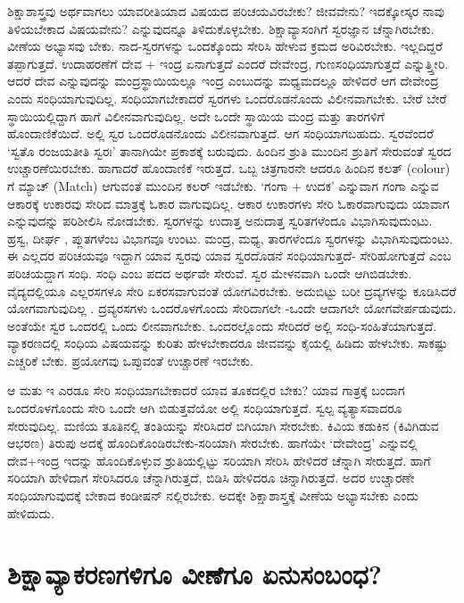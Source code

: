 ಶಿಕ್ಷಾಶಾಸ್ತ್ರವು ಅರ್ಥವಾಗಲು ಯಾವರೀತಿಯಾದ ವಿಷಯದ ಪರಿಚಯವಿರಬೇಕು? ಜೀವವೇನು? ಇದಕ್ಕೋಸ್ಕರ ನಾವು ತಿಳಿಯಬೇಕಾದ ವಿಷಯವೇನು? ಎನ್ನುವುದನ್ನೂ ತಿಳಿದುಕೊಳ್ಳಬೇಕು. ಶಿಕ್ಷಾವ್ಯಾಸಂಗಿಗೆ ಸ್ವರಜ್ಞಾನ ಚೆನ್ನಾಗಿರಬೇಕು. ವೀಣೆಯ ಅಭ್ಯಾಸವು ಬೇಕು. ನಾದ-ಸ್ವರಗಳನ್ನು ಒಂದಕ್ಕೊಂದು ಸೇರಿಸಿ ಹೇಳುವ ಕ್ರಮದ ಅರಿವಿರಬೇಕು. ಇಲ್ಲದಿದ್ದರೆ ತಪ್ಪಾಗುತ್ತದೆ. ಉದಾಹರಣೆಗೆ ದೇವ + ಇಂದ್ರ  ಏನಾಗುತ್ತದೆ ಎಂದರೆ ದೇವೇಂದ್ರ, ಗುಣಸಂಧಿಯಾಗುತ್ತದೆ ಎನ್ನುತ್ತ್ತೀರಿ. ಆದರೆ ದೇವ ಎನ್ನುವುದನ್ನು ಮಂದ್ರಸ್ಥಾಯಿಯಲ್ಲೂ ಇಂದ್ರ ಎಂಬುದನ್ನು ಮಧ್ಯಮದಲ್ಲೂ  ಹೇಳಿದರೆ ಆಗ ದೇವೇಂದ್ರ ಎಂದು ಸಂಧಿಯಾಗುವುದಿಲ್ಲ. ಸಂಧಿಯಾಗಬೇಕಾದರೆ ಸ್ವರಗಳು ಒಂದರೊಡನೊಂದು ವಿಲೀನವಾಗಬೇಕು. ಬೇರೆ ಬೇರೆ ಸ್ಥಾಯಿಯಲ್ಲಿದ್ದಾಗ ಹಾಗೆ ವಿಲೀನವಾಗುವುದಿಲ್ಲ. ಅದೇ ಒಂದೇ ಸ್ಥಾಯಿಯ ಮಂದ್ರ ಮತ್ತು ತಾರಗಳಿಗೆ ಹೊಂದಾಣಿಕೆಯಿದೆ. ಅಲ್ಲಿ ಸ್ವರ ಒಂದರೊಡನೊಂದು ವಿಲೀನವಾಗುತ್ತದೆ. ಆಗ ಸಂಧಿಯಾಗಬಹುದು. ಸ್ವರವೆಂದರೆ `ಸ್ವತೊ ರಂಜಯತೀತಿ ಸ್ವರಃ'\label{11} ತಾನಾಗಿಯೇ ಪ್ರಕಾಶಕ್ಕೆ ಬರುವುದು. ಹಿಂದಿನ ಶ್ರುತಿ ಮುಂದಿನ ಶ್ರುತಿಗೆ ಸೇರುವಂತೆ ಸ್ವರದ ಉಚ್ಚಾರಣೆಯಿರಬೇಕು. ಹಾಗಾದರೆ ಹೊಂದಾಣಿಕೆ ಇರುತ್ತದೆ. ಒಬ್ಬ ಚಿತ್ರಗಾರನೇ ಆದರೂ ಹಿಂದಿನ ಕಲತ್ {(\eng colour)} ಗೆ ಮ್ಯಾಚ್ {(\eng Match)} ಆಗುವಂತೆ ಮುಂದಿನ ಕಲರ್ ಇಡಬೇಕು. `ಗಂಗಾ + ಉದಕ' ಎನ್ನುವಾಗ ಗಂಗಾ ಎನ್ನುವ ಆಕಾರಕ್ಕೆ  ಉಕಾರವು ಸೇರಿದ ಮಾತ್ರಕ್ಕೆ  ಓಕಾರ ವಾಗುವುದಿಲ್ಲ. ಆಕಾರ ಉಕಾರಗಳು ಸೇರಿ ಓಕಾರವಾಗುವುದು ಯಾವಾಗ ಎನ್ನುವುದನ್ನು ಪರಿಶೀಲಿಸಿ ನೋಡಬೇಕು. ಸ್ವರಗಳನ್ನು ಉದಾತ್ತ ಅನುದಾತ್ತ ಸ್ವರಿತಗಳೆಂದೂ ವಿಭಾಗಿಸುವುದುಂಟು. ಹ್ರಸ್ವ, ದೀರ್ಘ , ಪ್ಲುತಗಳೆಂಬ ವಿಭಾಗವೂ ಉಂಟು. ಮಂದ್ರ, ಮಧ್ಯ, ತಾರಗಳೆಂದೂ ಸ್ವರಗಳನ್ನು  ವಿಭಾಗಿಸುವುದುಂಟು. ಈ ಎಲ್ಲದರ ಪರಿಚಯವೂ ಇದ್ದಾಗ ಯಾವ ಸ್ವರವು ಯಾವ ಸ್ವರದೊಡನೆ ಸಂಧಿಯಾಗುತ್ತದೆ- ಸೇರಿಹೋಗುತ್ತದೆ ಎಂಬ ಪರಿಚಯದ್ದಾಗ ಸಂಧಿ. ಸಂಧಿ ಎಂಬ ಪದದ ಅರ್ಥವೇ ಸೇರುವೆ. ಸ್ವರ ಮೇಳನವಾಗಿ ಒಂದೇ ಆಗಿಬಿಡಬೇಕು. ವೈದ್ಯದಲ್ಲಿಯೂ ಎಲ್ಲರಸಗಳೂ ಸೇರಿ  ಏಕರಸವಾಗುವಂತೆ ಯೋಗವಿರಬೇಕು. ಅದುಬಿಟ್ಟು ಬರೀ ದ್ರವ್ಯಗಳನ್ನು ಕೂಡಿಸಿದರೆ ಯೋಗವಾಗುವುದಿಲ್ಲ .  ದ್ರವ್ಯರಸಗಳು ಒಂದರೊಳಗೊಂದು ಸೇರಿದಾಗಲೇ -ಒಂದೇ ಆದಾಗಲೇ ಯೋಗವೇರ್ಪಡುವುದು. ಅಂತೆಯೇ ಸ್ವರ ಒಂದರಲ್ಲಿ ಒಂದು ಲೀನವಾಗಬೇಕು. ಒಂದರಲ್ಲೊಂದು ಸೇರಿದರೆ ಅಲ್ಲಿ ಸಂಧಿ-ಸಂಹಿತೆಯಾಗುತ್ತದೆ. ವ್ಯಾಕರಣದಲ್ಲಿ ಸಂಧಿಯ ವಿಷಯವನ್ನು ಕುರಿತು ಹೇಳಬೇಕಾದರೂ ಜೀವವನ್ನು ಕೈಯಲ್ಲಿ ಹಿಡಿದು ಹೇಳಬೇಕು. ಸಾಕಷ್ಟು ಎಚ್ಚರಿಕೆ ಬೇಕು. ಪ್ರಯೋಗವು ಒಪ್ಪುವಂತೆ ಉಚ್ಚಾರಣೆ ಇರಬೇಕು.

ಆ ಮತು ಇ ಎರಡೂ ಸೇರಿ ಸಂಧಿಯಾಗಬೇಕಾದರೆ ಯಾವ ತೂಕದಲ್ಲಿರ ಬೇಕು? ಯಾವ ಗಾತ್ರಕ್ಕೆ  ಬಂದಾಗ ಒಂದರೊಳಗೊಂದು ಸೇರಿ ಒಂದೇ ಆಗಿ ಬಿಡುತ್ತವೆಯೋ ಅಲ್ಲಿ ಸಂಧಿಯಾಗುತ್ತದೆ. ಸ್ವಲ್ಪ  ವ್ಯತ್ಯಾಸವಾದರೂ ಸೇರುವುದಿಲ್ಲ. ಮಣಿಯ ತೂತಿನಲ್ಲಿ  ತಂತಿಯನ್ನು  ಸೇರಿಸಿದರೆ ಬಿಗಿಯಾಗಿ ಸೇರಬೇಕು. ಕಿವಿಯ ಕಡುಕಿನ (ಕಿವಿಗಿಡುವ ಆಭರಣ) ತಿರುಪು ಅದಕ್ಕೆ  ಹೊಂದಿಕೊಂಡಿರಬೇಕು-ಸರಿಯಾಗಿ ಸೇರಬೇಕು. ಹಾಗೆಯೇ `ದೇವೇಂದ್ರ' ಎನ್ನುವಲ್ಲಿ ದೇವ+ಇಂದ್ರ ಇದನ್ನು  ಹೊಂದಿಕೊಳ್ಳುವ ಶ್ರುತಿಯಲ್ಲಿಟ್ಟು ಸರಿಯಾಗಿ ಸೇರಿಸಿ ಹೇಳಿದರೆ ಚೆನ್ನಾಗಿ ಸೇರುತ್ತದೆ. ಹಾಗೆ ಸರಿಯಾಗಿ ಹೇಳಿದಾಗ ಸೇರಿಸಿದರೂ ಚೆನ್ನಾಗಿರುತ್ತದೆ, ಬಿಡಿಸಿ ಹೇಳಿದರೂ ಚಿನ್ನಾಗಿರುತ್ತದೆ. ಅದರ ಉಚ್ಚಾರಣೇ ಸಂಧಿಯಾಗುವುದಕ್ಕೆ ಬೇಕಾದ ಕಂಡೀಷನ್ ನಲ್ಲಿರಬೇಕು. ಅದಕ್ಕೇ ಶಿಕ್ಷಾಶಾಸ್ತ್ರಕ್ಕೆ ವೀಣೆಯ ಅಭ್ಯಾಸಬೇಕು ಎಂದು ಹೇಳಿದುದು.

\section*{ಶಿಕ್ಷಾವ್ಯಾಕರಣಗಳಿಗೂ ವೀಣೆಗೂ ಏನುಸಂಬಂಧ?}

